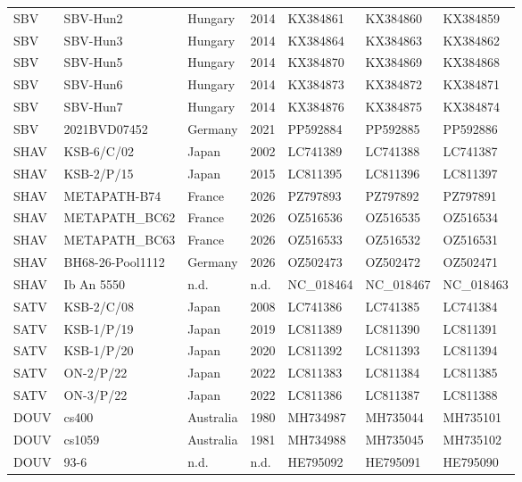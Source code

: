 \begin{table}[htbp]
\begin{tabular}{lllllll}
SBV & SBV-Hun2 & Hungary & 2014 & KX384861 & KX384860 & KX384859 \\
SBV & SBV-Hun3 & Hungary & 2014 & KX384864 & KX384863 & KX384862 \\
SBV & SBV-Hun5 & Hungary & 2014 & KX384870 & KX384869 & KX384868 \\
SBV & SBV-Hun6 & Hungary & 2014 & KX384873 & KX384872 & KX384871 \\
SBV & SBV-Hun7 & Hungary & 2014 & KX384876 & KX384875 & KX384874 \\
SBV & 2021BVD07452 & Germany & 2021 & PP592884 & PP592885 & PP592886 \\
SHAV & KSB-6/C/02 & Japan & 2002 & LC741389 & LC741388 & LC741387 \\
SHAV & KSB-2/P/15 & Japan & 2015 & LC811395 & LC811396 & LC811397 \\
SHAV & METAPATH-B74 & France & 2026 & PZ797893 & PZ797892 & PZ797891 \\
SHAV & METAPATH\_BC62 & France & 2026 & OZ516536 & OZ516535 & OZ516534 \\
SHAV & METAPATH\_BC63 & France & 2026 & OZ516533 & OZ516532 & OZ516531 \\
SHAV & BH68-26-Pool1112 & Germany & 2026 & OZ502473 & OZ502472 & OZ502471 \\
SHAV & Ib An 5550 & n.d. & n.d. & NC\_018464 & NC\_018467 & NC\_018463 \\
SATV & KSB-2/C/08 & Japan & 2008 & LC741386 & LC741385 & LC741384 \\
SATV & KSB-1/P/19 & Japan & 2019 & LC811389 & LC811390 & LC811391 \\
SATV & KSB-1/P/20 & Japan & 2020 & LC811392 & LC811393 & LC811394 \\
SATV & ON-2/P/22 & Japan & 2022 & LC811383 & LC811384 & LC811385 \\
SATV & ON-3/P/22 & Japan & 2022 & LC811386 & LC811387 & LC811388 \\
DOUV & cs400 & Australia & 1980 & MH734987 & MH735044 & MH735101 \\
DOUV & cs1059 & Australia & 1981 & MH734988 & MH735045 & MH735102 \\
DOUV & 93-6 & n.d. & n.d. & HE795092 & HE795091 & HE795090 \\
\bottomrule
\end{tabular}
\end{table}

